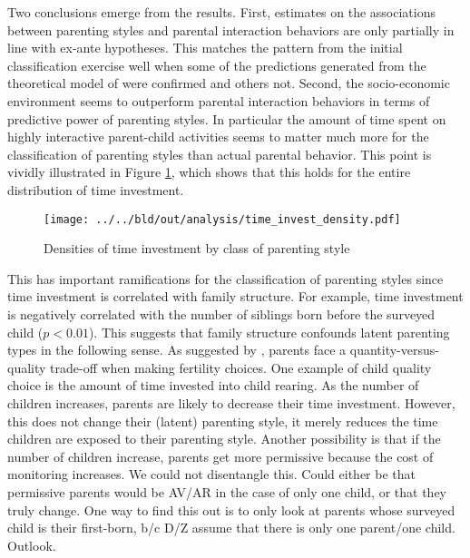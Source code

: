 Two conclusions emerge from the results. First, estimates on the associations between parenting styles and parental interaction behaviors are only partially in line with ex-ante hypotheses. This matches the pattern from the initial classification exercise well when some of the predictions generated from the theoretical model of \textcite{doepkeParentingStyleAltruism2017} were confirmed and others not. Second, the socio-economic environment seems to outperform parental interaction behaviors in terms of predictive power of parenting styles. In particular the amount of time spent on highly interactive parent-child activities seems to matter much more for the classification of parenting styles than actual parental behavior. This point is vividly illustrated in Figure \ref{fig:density}, which shows that this holds for the entire distribution of time investment.

\begin{figure}[htb]
	\centering
	\texttt{[image: ../../bld/out/analysis/time\_invest\_density.pdf]}
	\caption{Densities of time investment by class of parenting style}
	\vspace{-0.25cm}
	\label{fig:density}  
\end{figure} 

This has important ramifications for the classification of parenting styles since time investment is correlated with family structure. For example, time investment is negatively correlated with the number of siblings born before the surveyed child ($p < 0.01$). This suggests that family structure confounds latent parenting types in the following sense. As suggested by \textcite{beckerTreatiseFamily1981}, parents face a quantity-versus-quality trade-off when making fertility choices. One example of child quality choice is the amount of time invested into child rearing. As the number of children increases, parents are likely to decrease their time investment. However, this does not change their (latent) parenting style, it merely reduces the time children are exposed to their parenting style. Another possibility is that if the number of children increase, parents get more permissive because the cost of monitoring increases. We could not disentangle this. Could either be that permissive parents would be AV/AR in the case of only one child, or that they truly change. One way to find this out is to only look at parents whose surveyed child is their first-born, b/c D/Z assume that there is only one parent/one child. Outlook.

